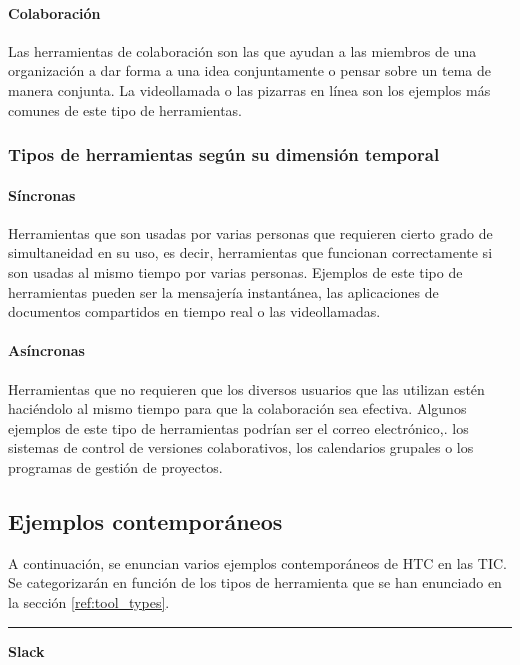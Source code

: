 \paragraph{Colaboración}

Las herramientas de colaboración son las que ayudan a las miembros de una organización a dar forma a una idea conjuntamente o pensar sobre un tema de manera conjunta. La videollamada o las pizarras en línea son los ejemplos más comunes de este tipo de herramientas.

\subsubsection{Tipos de herramientas según su dimensión temporal}

\paragraph{Síncronas}

Herramientas que son usadas por varias personas que requieren cierto grado de simultaneidad en su uso, es decir, herramientas que funcionan correctamente si son usadas al mismo tiempo por varias personas. Ejemplos de este tipo de herramientas pueden ser la mensajería instantánea, las aplicaciones de documentos compartidos en tiempo real o las videollamadas.

\paragraph{Asíncronas}

Herramientas que no requieren que los diversos usuarios que las utilizan estén haciéndolo al mismo tiempo para que la colaboración sea efectiva. Algunos ejemplos de este tipo de herramientas podrían ser el correo electrónico,. los sistemas de control de versiones colaborativos, los calendarios grupales o los programas de gestión de proyectos.

\subsection{Ejemplos contemporáneos}

A continuación, se enuncian varios ejemplos contemporáneos de HTC en las TIC. Se categorizarán en función de los tipos de herramienta que se han enunciado en la sección \ref{ref:tool_types}.

\noindent\rule{\textwidth}{0.5pt}

{ \large \textbf{Slack} }

